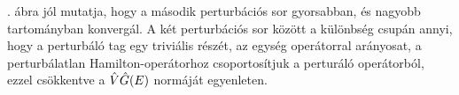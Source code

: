 . ábra jól mutatja, hogy a második perturbációs sor gyorsabban, és nagyobb tartományban konvergál. A két perturbációs sor között a különbség csupán annyi, hogy a perturbáló tag egy triviális részét, az egység operátorral arányosat, a perturbálatlan Hamilton-operátorhoz csoportosítjuk a perturáló operátorból, ezzel csökkentve a $\hat{V}\hat{G}(E)$ normáját \aeqref{} egyenleten.






